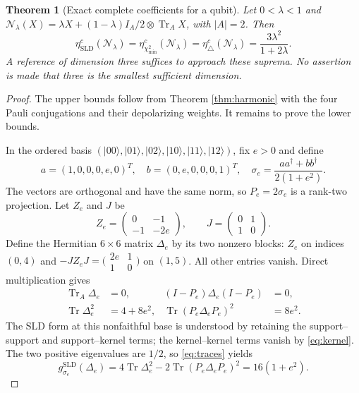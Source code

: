 \documentclass[11pt]{article}
\newcommand{\Tr}{\operatorname{Tr}}
\newcommand{\N}{\mathcal N}
\newcommand{\gmin}{g^{\mathrm{SLD}}}
\newtheorem{theorem}{Theorem}
\theoremstyle{remark}
\begin{document}
\begin{theorem}[Exact complete coefficients for a qubit]\label{thm:exact}
Let \(0<\lambda<1\) and
\(\N_\lambda(X)=\lambda X+(1-\lambda)I_A/2\otimes\Tr_AX\), with \(|A|=2\).
Then
\begin{equation}\label{eq:exact}
 \eta_{\mathrm{SLD}}^c(\N_\lambda)
 =\eta_{\chi^2_{\min}}^c(\N_\lambda)
 =\eta_{\triangle}^c(\N_\lambda)
 =\frac{3\lambda^2}{1+2\lambda}.
\end{equation}
A reference of dimension three suffices to approach these suprema.
No assertion is made that three is the smallest sufficient dimension.
\end{theorem}
\begin{proof}
The upper bounds follow from Theorem \ref{thm:harmonic} with the four Pauli conjugations and their depolarizing weights. It remains to prove the lower bounds.

In the ordered basis
\((|00\rangle,|01\rangle,|02\rangle,|10\rangle,|11\rangle,|12\rangle)\),
fix \(e>0\) and define
\[
 a=(1,0,0,0,e,0)^T,\quad
 b=(0,e,0,0,0,1)^T,\quad
 \sigma_e=\frac{aa^\dagger+bb^\dagger}{2(1+e^2)}.
\]
The vectors are orthogonal and have the same norm, so
\(P_e=2\sigma_e\) is a rank-two projection.
Let \(Z_e\) and \(J\) be
\[
 Z_e=\begin{pmatrix}0&-1\\-1&-2e\end{pmatrix},
 \qquad J=\begin{pmatrix}0&1\\1&0\end{pmatrix}.
\]
Define the Hermitian \(6\times6\) matrix \(\Delta_e\) by its two nonzero blocks:
\(Z_e\) on indices \((0,4)\) and
\(-JZ_eJ=\bigl(\begin{smallmatrix}2e&1\\1&0\end{smallmatrix}\bigr)\)
on \((1,5)\). All other entries vanish.
Direct multiplication gives
\begin{align}
 \Tr_A\Delta_e&=0,&
 (I-P_e)\Delta_e(I-P_e)&=0,\label{eq:kernel}\\
 \Tr\Delta_e^2&=4+8e^2,&
 \Tr(P_e\Delta_eP_e)^2&=8e^2.\label{eq:traces}
\end{align}
The SLD form at this nonfaithful base is understood by retaining the support--support and support--kernel terms; the kernel--kernel terms vanish by \eqref{eq:kernel}. The two positive eigenvalues are \(1/2\), so \eqref{eq:traces} yields
\begin{equation}\label{eq:input}
 \gmin_{\sigma_e}(\Delta_e)
 =4\Tr\Delta_e^2-2\Tr(P_e\Delta_eP_e)^2
 =16(1+e^2).
\end{equation}


\end{proof}
\end{document}
